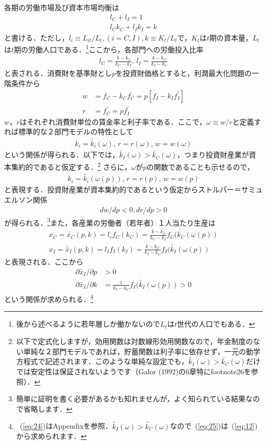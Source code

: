 \documentclass[12pt,a4paper]{jsarticle}
\begin{document}
各期の労働市場及び資本市場均衡は
\begin{align}
 l_{C} +  l_{I} =1 \\
 l_{C} k_{C}+  l_{I} k_{I}= k
\end{align}
と書ける．ただし，$l_{i} \equiv L_{it}/L_{t},  (i = C,I), k \equiv K_{t}/L_{t}$で，$K_{t}$は$t$期の資本量，$L_{t}$は$t$期の労働人口である．\footnote{
後から述べるように若年層しか働かないので$L_{t}$は$t$世代の人口でもある．
}ここから，各部門への労働投入比率
\begin{align}
 l_{C} = \frac{k-k_{I}}{k_{C}-k_{I}}, \,  l_{I} = \frac{k-k_{C}}{k_{I}-k_{C}}
\end{align}
と表される．消費財を基準財とし$p$を投資財価格とすると，利潤最大化問題の一階条件から
\begin{align}
 w &= f_{C} - k_{C} f_{C}^{\prime} = p \left[f_{I} - k_{I} f_{I}^{\prime} \right] \\
r &= f_{C}^{\prime} =  p f_{I}^{\prime}
\end{align}
$w$，$r$はそれぞれ消費財単位の賃金率と利子率である．ここで，$\omega \equiv w/r$と定義すれば標準的な２部門モデルの特性として
\begin{align}
 k_{i} =\tilde{k_{i}}(\omega), \, r =r(\omega), \, w = w(\omega) \label{eq:17}
\end{align}
という関係が得られる．以下では，$\tilde{k_{I}}(\omega) > \tilde{k_{C}}(\omega)$，つまり投資財産業が資本集約的であると仮定する．\footnote{以下で定式化しますが，効用関数は対数線形効用関数なので，年金制度のない単純な２部門モデルであれば，貯蓄関数は利子率に依存せず，一元の動学方程式で記述されます．このような単純な設定でも，$\tilde{k_{I}}(\omega) > \tilde{k_{C}}(\omega)$だけでは安定性は保証されないようです（Galor (1992)の6章特にfootnote26を参照）．}
さらに，$\omega$が$p$の関数であることも示せるので，
\begin{align}
  k_{i} =\tilde{k_{i}}(\omega(p)), \, r =r(p), \, w = w(p)
\end{align}
と表現する．投資財産業が資本集約的であるという仮定からストルパー＝サミュエルソン関係
\begin{align}
 dw/dp <0, dr/dp>0 \label{eq:7}
\end{align}
が得られる．\footnote{簡単に証明を書く必要があるかも知れませんが，よく知られている結果なので省略します．}また，各産業の労働者（若年者）１人当たり生産は
\begin{align}
 x_{C} = \tilde{ x_{C}}(p, k) = l_{c}f_{C}(k_{C}) = \frac{k-k_{I}}{k_{C}-k_{I}} f_{C}(\tilde{k_{C}}(\omega(p))  \label{eq:11}\\
x_{I} = \tilde{ x_{I}}(p, k) = l_{I}f_{I}(k_{I}) = \frac{k -k_{C}}{k_{I}-k_{C}} f_{I}(\tilde{k_{I}}(\omega(p)) \label{eq:12}
\end{align}
と表現される．ここから
\begin{align}
  \partial \tilde{x_{I}}/ \partial p &>0 \label{eq:24}\\
\partial \tilde{x_{I}}/ \partial k &= \frac{1}{k_{I}-k_{C}} f_{I}(\tilde{k_{I}}(\omega(p))>0 \label{eq:25}
\end{align}
という関係が求められる．\footnote{~(\ref{eq:24})はAppendixを参照．$\tilde{k_{I}}(\omega) > \tilde{k_{C}}(\omega)$なので~(\ref{eq:25})は~(\ref{eq:12})から求められます．}
\end{document}
